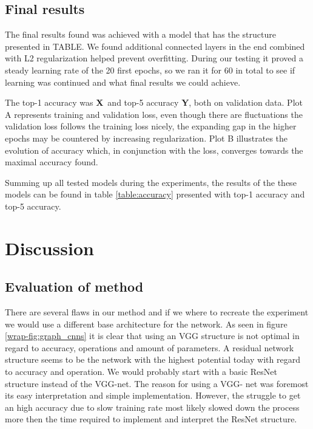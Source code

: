 \documentclass{kthreport}
\begin{document}
\subsection{Final results}



\begin{table}
  
\end{table}
The final results found was achieved with a model that has the structure presented in TABLE. We found additional connected layers in the end combined with L2 regularization helped prevent overfitting. During our testing it proved a steady learning rate of the 20 first epochs, so we ran it for 60 in total to see if learning was continued and what final results we could achieve.

The top-1 accuracy was \textbf{X}\ and top-5 accuracy \textbf{Y}, both on validation data. Plot A represents training and validation loss, even though there are fluctuations the validation loss follows the training loss nicely, the expanding gap in the higher epochs may be countered by increasing regularization. Plot B illustrates the evolution of accuracy which, in conjunction with the loss, converges towards the maximal accuracy found.

Summing up all tested models during the experiments, the results of the these models can be found in table \ref{table:accuracy} presented with top-1 accuracy and top-5 accuracy. \\




\clearpage
\section{Discussion}
\label{sec:Discussion}

\subsection{Evaluation of method}

There are several flaws in our method and if we where to recreate the experiment we would use a different base architecture for the network.
As seen in figure \ref{wrap-fig:graph_cnns} it is clear that using an VGG structure is not optimal in regard to accuracy, operations and amount of parameters.
A residual network structure seems to be the network with the highest potential today with regard to accuracy and operation.
We would probably start with a basic ResNet structure instead of the VGG-net.
The reason for using a VGG- net was foremost its easy interpretation and simple implementation. However, the struggle to get an high accuracy due to slow training rate most likely slowed down the process more then the time required to implement and interpret the ResNet structure.
\end{document}
